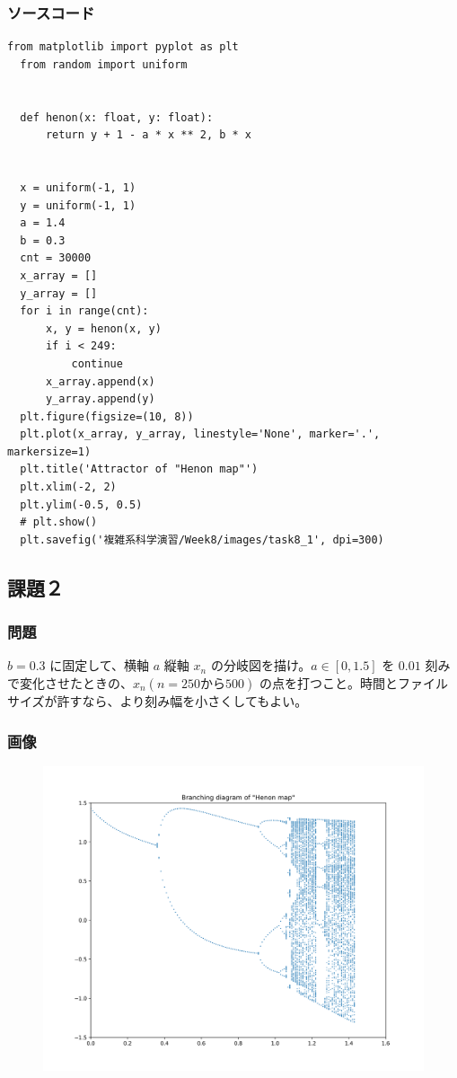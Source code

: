 \subsubsection{ソースコード}
\begin{lstlisting}[caption=task8-1.py]
  from matplotlib import pyplot as plt
  from random import uniform


  def henon(x: float, y: float):
      return y + 1 - a * x ** 2, b * x


  x = uniform(-1, 1)
  y = uniform(-1, 1)
  a = 1.4
  b = 0.3
  cnt = 30000
  x_array = []
  y_array = []
  for i in range(cnt):
      x, y = henon(x, y)
      if i < 249:
          continue
      x_array.append(x)
      y_array.append(y)
  plt.figure(figsize=(10, 8))
  plt.plot(x_array, y_array, linestyle='None', marker='.', markersize=1)
  plt.title('Attractor of "Henon map"')
  plt.xlim(-2, 2)
  plt.ylim(-0.5, 0.5)
  # plt.show()
  plt.savefig('複雑系科学演習/Week8/images/task8_1', dpi=300)
\end{lstlisting}

\newpage
\subsection{課題２}
\subsubsection{問題}
$b = 0.3$ に固定して、横軸 $a$ 縦軸 $x_n$ の分岐図を描け。$a \in [0, 1.5]$ を $0.01$ 刻みで変化させたときの、$x_n(n = 250から500)$ の点を打つこと。時間とファイルサイズが許すなら、より刻み幅を小さくしてもよい。
\subsubsection{画像}
\begin{figure}[htbp]
  \centering
  \includegraphics[keepaspectratio, scale=0.5]{images/Problem8/task8_2.png}
\end{figure}
